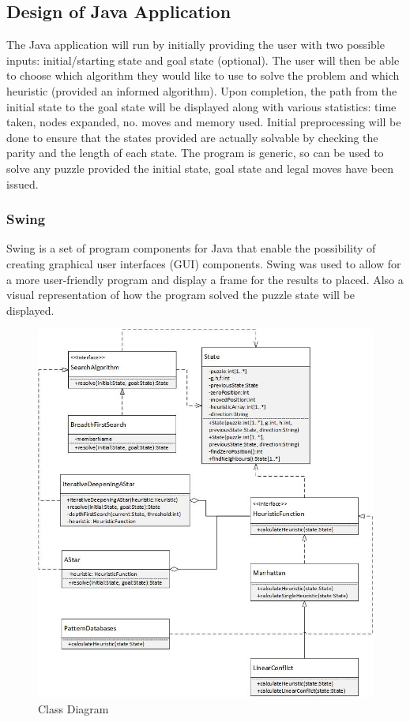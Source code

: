 \documentclass[final]{cmpreport}
\begin{document}
\subsection{Design of Java Application}
The Java application will run by initially providing the user with two possible inputs: initial/starting state and goal state (optional). The user will then be able to choose which algorithm they would like to use to solve the problem and which heuristic (provided an informed algorithm). Upon completion, the path from the initial state to the goal state will be displayed along with various statistics: time taken, nodes expanded, no. moves and memory used. Initial preprocessing will be done to ensure that the states provided are actually solvable by checking the parity and the length of each state. The program is generic, so can be used to solve any puzzle provided the initial state, goal state and legal moves have been issued.

\subsubsection{Swing}
Swing is a set of program components for Java that enable the possibility of creating graphical user interfaces (GUI) components. Swing was used to allow for a more user-friendly program and display a frame for the results to placed. Also a visual representation of how the program solved the puzzle state will be displayed.
\begin{figure}[h!]
	\centering
	\includegraphics[width=1.1\textwidth]{classDiagram}
	\captionsetup{justification=centering}
	\caption{Class Diagram}
\end{figure}
\end{document}
